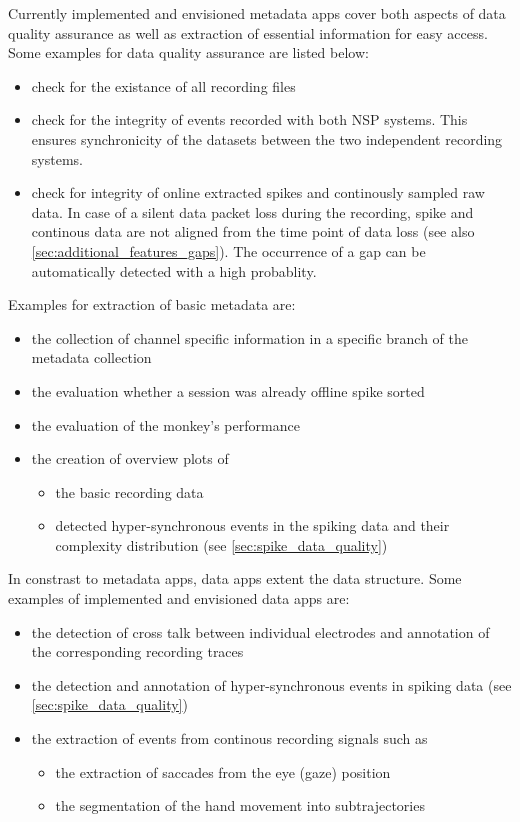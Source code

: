 Currently implemented and envisioned metadata apps cover both aspects of data quality assurance as well as extraction of essential information for easy access. Some examples for data quality assurance are listed below:
\begin{itemize}
 \item check for the existance of all recording files
 \item check for the integrity of events recorded with both NSP systems. This ensures synchronicity of the datasets between the two independent  recording systems.
 \item check for integrity of online extracted spikes and continously sampled raw data. In case of a silent data packet loss during the recording, spike and continous data are not aligned from the time point of data loss (see also \cref{sec:additional_features_gaps}). The occurrence of a gap can be automatically detected with a high probablity.
\end{itemize}

Examples for extraction of basic metadata are:
\begin{itemize}
  \setlength{\itemsep}{1pt}
  \setlength{\parskip}{0pt}
  \setlength{\parsep}{0pt}
 \item the collection of channel specific information in a specific branch of the metadata collection
 \item the evaluation whether a session was already offline spike sorted
 \item the evaluation of the monkey's performance
 \item the creation of overview plots of 
 \begin{itemize}
  \item the basic recording data
  \item detected hyper-synchronous events in the spiking data and their complexity distribution (see \cref{sec:spike_data_quality})
 \end{itemize}
\end{itemize}

In constrast to metadata apps, data apps extent the  data structure. Some examples of implemented and envisioned data apps are:
\begin{itemize}
  \setlength{\itemsep}{1pt}
  \setlength{\parskip}{0pt}
  \setlength{\parsep}{0pt}
 \item the detection of cross talk between individual electrodes and annotation of the corresponding recording traces
  \item the detection and annotation of hyper-synchronous events in spiking data (see \cref{sec:spike_data_quality})
 \item the extraction of events from continous recording signals such as
 \begin{itemize}
  \item the extraction of saccades from the eye (gaze) position
  \item the segmentation of the hand movement into subtrajectories
 \end{itemize}
\end{itemize}


